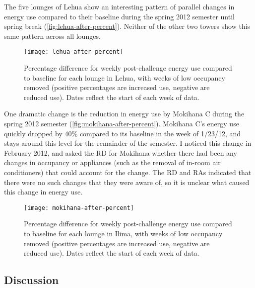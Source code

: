 The five lounges of Lehua show an interesting pattern of parallel changes in energy use compared to their baseline during the spring 2012 semester until spring break (\autoref{fig:lehua-after-percent}). Neither of the other two towers show this same pattern across all lounges.

\begin{figure}[htbp]
	\centering
	\texttt{[image: lehua-after-percent]}
	\caption[Percentage post-challenge energy use difference from baseline for Lehua]{Percentage difference for weekly post-challenge energy use compared to baseline for each lounge in Lehua, with weeks of low occupancy removed (positive percentages are increased use, negative are reduced use). Dates reflect the start of each week of data.}
	\label{fig:lehua-after-percent}
\end{figure}

One dramatic change is the reduction in energy use by Mokihana C during the spring 2012 semester (\autoref{fig:mokihana-after-percent}). Mokihana C's energy use quickly dropped by 40\% compared to its baseline in the week of 1/23/12, and stays around this level for the remainder of the semester. I noticed this change in February 2012, and asked the RD for Mokihana whether there had been any changes in occupancy or appliances (such as the removal of in-room air conditioners) that could account for the change. The RD and RAs indicated that there were no such changes that they were aware of, so it is unclear what caused this change in energy use.

\begin{figure}[htbp]
	\centering
	\texttt{[image: mokihana-after-percent]}
	\caption[Percentage post-challenge energy use difference from baseline for Mokihana]{Percentage difference for weekly post-challenge energy use compared to baseline for each lounge in Ilima, with weeks of low occupancy removed (positive percentages are increased use, negative are reduced use). Dates reflect the start of each week of data.}
	\label{fig:mokihana-after-percent}
\end{figure}


\subsection{Discussion}
\label{sec:energy-result-discussion}

